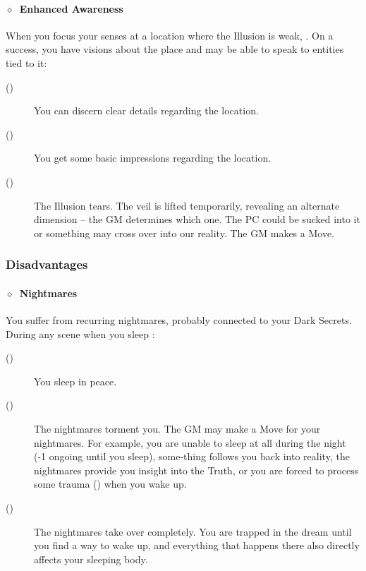 \paragraph{\(\diamond\)~Enhanced Awareness}%
When you focus your senses at a location where the Illusion is weak, . On a success,
you have visions about the place and may be able to speak to entities tied to it:
\begin{description}
 \item[()] You can discern clear details regarding the location.
 \item[()] You get some basic impressions regarding the location.
 \item[()] The Illusion tears. The veil is lifted temporarily, revealing an alternate
    dimension – the GM determines which one. The PC could be sucked into it or something may cross
    over into our reality. The GM makes a Move.
\end{description}
\KULTrule%

\subsubsection{Disadvantages}%
\label{ssub:artist_disadvantages}

\paragraph{\(\diamond\)~Nightmares}%
You suffer from recurring nightmares, probably connected to your Dark Secrets. During any scene when
you sleep :
\begin{description}
 \item[()] You sleep in peace.
 \item[()] The nightmares torment you. The GM may make a Move for your nightmares.
    For example, you are unable to sleep at all during the night (-1 ongoing until you sleep),
    some-thing follows you back into reality, the nightmares provide you insight into the Truth, or
    you are forced to process some trauma () when you wake up.
\item[()] The nightmares take over completely. You are trapped in the dream until you
    find a way to wake up, and everything that happens there also directly affects your sleeping
    body.
\end{description}
\KULTrule%

